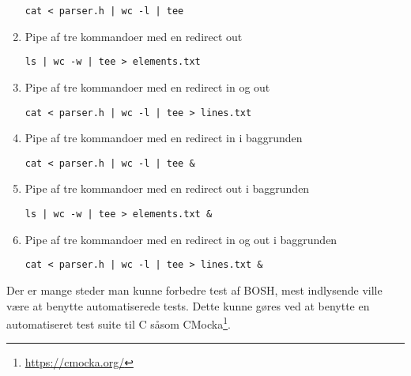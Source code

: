 \begin{enumerate}
	\texttt{cat < parser.h | wc -l | tee}
	\item  Pipe af tre kommandoer med en redirect out
	
	\texttt{ls | wc -w | tee > elements.txt}
	\item  Pipe af tre kommandoer med en redirect in og out
	
	\texttt{cat < parser.h | wc -l | tee > lines.txt}
	\item  Pipe af tre kommandoer med en redirect in i baggrunden
	
	\texttt{cat < parser.h | wc -l | tee \&}
	\item  Pipe af tre kommandoer med en redirect out i baggrunden
	
	\texttt{ls | wc -w | tee > elements.txt \&}
	\item  Pipe af tre kommandoer med en redirect in og out i baggrunden
	
	\texttt{cat < parser.h | wc -l | tee > lines.txt \&}
\end{enumerate}

Der er mange steder man kunne forbedre test af BOSH, mest indlysende ville være at benytte automatiserede tests. Dette kunne gøres ved at benytte en automatiseret test suite til C såsom CMocka\footnote{\url{https://cmocka.org/}}.
